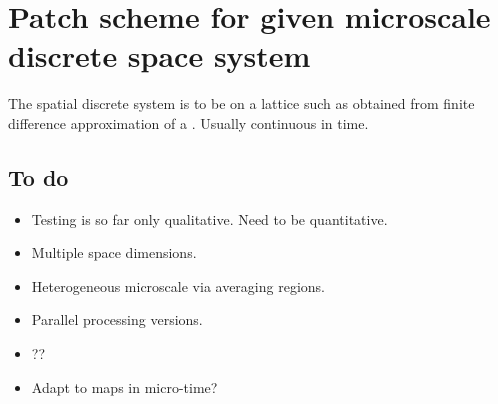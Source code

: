 \section{Patch scheme for given microscale discrete space system}
\label{sec:patch}

The spatial discrete system is to be on a lattice such as obtained from finite difference approximation of a \pde.
Usually continuous in time.





\subsection{To do}
\begin{itemize}
\item Testing is so far only qualitative.  Need to be quantitative.
\item Multiple space dimensions.
\item Heterogeneous microscale via averaging regions.
\item Parallel processing versions.
\item ??
\item Adapt to maps in micro-time?
\end{itemize}
